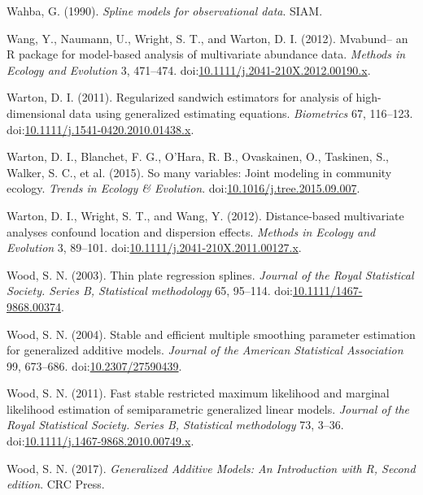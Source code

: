 \documentclass[12pt,]{article}
\begin{document}
\hypertarget{ref-Wahba1990-ag}{}
Wahba, G. (1990). \emph{Spline models for observational data}. SIAM.

\hypertarget{ref-Wang2012-uu}{}
Wang, Y., Naumann, U., Wright, S. T., and Warton, D. I. (2012).
Mvabund-- an R package for model-based analysis of multivariate
abundance data. \emph{Methods in Ecology and Evolution} 3, 471--474.
doi:\href{https://doi.org/10.1111/j.2041-210X.2012.00190.x}{10.1111/j.2041-210X.2012.00190.x}.

\hypertarget{ref-Warton2011-vp}{}
Warton, D. I. (2011). Regularized sandwich estimators for analysis of
high-dimensional data using generalized estimating equations.
\emph{Biometrics} 67, 116--123.
doi:\href{https://doi.org/10.1111/j.1541-0420.2010.01438.x}{10.1111/j.1541-0420.2010.01438.x}.

\hypertarget{ref-Warton2015-ge}{}
Warton, D. I., Blanchet, F. G., O'Hara, R. B., Ovaskainen, O., Taskinen,
S., Walker, S. C., et al. (2015). So many variables: Joint modeling in
community ecology. \emph{Trends in Ecology \& Evolution}.
doi:\href{https://doi.org/10.1016/j.tree.2015.09.007}{10.1016/j.tree.2015.09.007}.

\hypertarget{ref-Warton2012-fg}{}
Warton, D. I., Wright, S. T., and Wang, Y. (2012). Distance-based
multivariate analyses confound location and dispersion effects.
\emph{Methods in Ecology and Evolution} 3, 89--101.
doi:\href{https://doi.org/10.1111/j.2041-210X.2011.00127.x}{10.1111/j.2041-210X.2011.00127.x}.

\hypertarget{ref-Wood2003-qy}{}
Wood, S. N. (2003). Thin plate regression splines. \emph{Journal of the
Royal Statistical Society. Series B, Statistical methodology} 65,
95--114.
doi:\href{https://doi.org/10.1111/1467-9868.00374}{10.1111/1467-9868.00374}.

\hypertarget{ref-Wood2004-zv}{}
Wood, S. N. (2004). Stable and efficient multiple smoothing parameter
estimation for generalized additive models. \emph{Journal of the
American Statistical Association} 99, 673--686.
doi:\href{https://doi.org/10.2307/27590439}{10.2307/27590439}.

\hypertarget{ref-Wood2011-kn}{}
Wood, S. N. (2011). Fast stable restricted maximum likelihood and
marginal likelihood estimation of semiparametric generalized linear
models. \emph{Journal of the Royal Statistical Society. Series B,
Statistical methodology} 73, 3--36.
doi:\href{https://doi.org/10.1111/j.1467-9868.2010.00749.x}{10.1111/j.1467-9868.2010.00749.x}.

\hypertarget{ref-Wood2017-qi}{}
Wood, S. N. (2017). \emph{Generalized Additive Models: An Introduction
with R, Second edition}. CRC Press.
\end{document}
